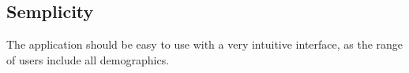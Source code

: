 \subsection{Semplicity}

The application should be easy to use with a very intuitive interface, as the range of users include all demographics.